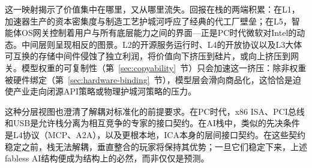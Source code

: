 这一映射揭示了价值集中在哪里，又从哪里流失。回报在栈的两端积累：在L1，加速器生产的资本密集度与制造工艺护城河呼应了经典的代工厂壁垒；在L5，智能体OS网关控制着用户与所有底层能力之间的界面---正是PC时代微软对Intel的动态。中间层则呈现相反的图景。L2的开源服务运行时、L4的开放协议以及L3大体可互换的存储中间件侵蚀了独立利润，将价值向下挤压到硅片，或向上挤压到网关。模型权重的可复制性（第~\ref{sec:copyability}~节）只会加速这一挤压：除非权重被硬件绑定（第~\ref{sec:hardware-binding}~节），模型层会滑向商品化，这恰恰是迫使产业走向闭源API策略或物理护城河策略的压力。

这种分层视图也澄清了解耦对标准化的前提要求。在PC时代，x86 ISA、PCI总线和USB是允许栈分离为相互竞争的专家的接口契约。在AI栈中，类似的先决条件是L4协议（MCP、A2A），以及更根本地，ICA本身的层间接口契约。在这些契约稳定之前，栈无法解耦，垂直整合的玩家将保持其优势；一旦它们稳定下来，上述fabless AI结构便成为结构上的必然，而非仅仅是预测。


